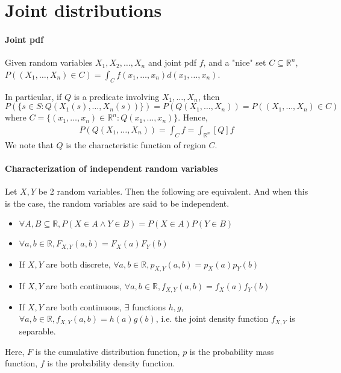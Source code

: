 \documentclass{article}
\begin{document}
\section{Joint distributions}
\paragraph{Joint pdf} Given random variables $X_1,X_2,\dots, X_n$ and joint pdf $f$, and a "nice" set $C\subseteq \mathbb{R}^n$, $P((X_1,\dots,X_n) \in C) = \int_C f(x_1,\dots, x_n) d(x_1,\dots,x_n)$.

In particular, if $Q$ is a predicate involving $X_1,\dots,X_n$, then $P(\{s\in S : Q(X_1(s),\dots,X_n(s))\}) = P(Q(X_1,\dots,X_n)) = P((X_1,\dots,X_n) \in C)$ where $C = \{(x_1,\dots,x_n)\in \mathbb{R}^n : Q(x_1,\dots,x_n)\}$. Hence,
\begin{align*}
	P(Q(X_1,\dots,X_n)) = \int_C f = \int_{\mathbb{R}^n}[Q]f
\end{align*}
We note that $Q$ is the characteristic function of region $C$.

\paragraph{Characterization of independent random variables} Let $X, Y$ be 2 random variables. Then the following are equivalent. And when this is the case, the random variables are said to be independent.
\begin{itemize}
	\item $\forall A, B\subseteq \mathbb{R}, P(X\in A\land Y\in B) = P(X\in A)P(Y\in B)$
	\item $\forall a, b\in \mathbb{R}, F_{X, Y}(a, b) = F_X(a)F_Y(b)$
	\item If $X, Y$ are both discrete, $\forall a, b\in \mathbb{R}, p_{X,Y}(a, b) = p_X(a)p_Y(b)$
	\item If $X, Y$ are both continuous, $\forall a, b\in \mathbb{R}, f_{X,Y}(a, b) = f_X(a)f_Y(b)$
	\item If $X, Y$ are both continuous, $\exists$ functions $h,g$, $\forall a,b\in \mathbb{R}, f_{X, Y}(a, b) = h(a)g(b)$, i.e. the joint density function $f_{X,Y}$ is separable. 
\end{itemize}
Here, $F$ is the cumulative distribution function, $p$ is the probability mass function, $f$ is the probability density function.
\end{document}
